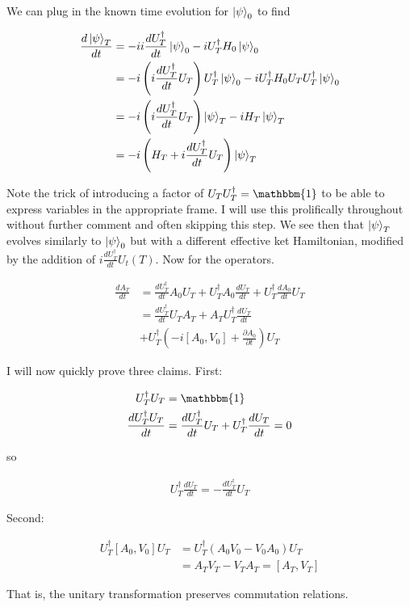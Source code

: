 \documentclass[12pt]{article}
\newcommand{\ddt}[1]{\frac{d #1}{dt}}
\begin{document}
We can plug in the known time evolution for $\ket{\psi}_0$ to find

\begin{align}
\ddt{\ket{\psi}_T} &= -i i\ddt{U_T^{\dag}} \ket{\psi}_0 -i U_T^{\dag} H_0 \ket{\psi}_0\\
&= -i \left(i\ddt{U_T^{\dag}} U_T\right) U_T^{\dag} \ket{\psi}_0 -i U_T^{\dag} H_0U_TU_T^{\dag} \ket{\psi}_0\\
&= -i \left(i\ddt{U_T^{\dag}} U_T\right) \ket{\psi}_T - i H_T \ket{\psi}_T\\
&= -i \left(H_T + i \ddt{U_T^{\dag}} U_T\right)\ket{\psi}_T
\end{align}

Note the trick of introducing a factor of $U_TU_T^{\dag} = \mathbbm{1}$ to be able to express variables in the appropriate frame. I will use this prolifically throughout without further comment and often skipping this step.
We see then that $\ket{\psi}_T$ evolves similarly to $\ket{\psi}_0$ but with a different effective ket Hamiltonian, modified by the addition of $i \ddt{U_T^{\dag}} U_t(T)$. Now for the operators.

\begin{align}
\ddt{A_T} &= \ddt{U_T^{\dag}}A_0U_T + U_T^{\dag}A_0\ddt{U_T} + U_T^{\dag} \ddt{A_0} U_T\\
&= \ddt{U_T^{\dag}} U_TA_T + A_T U_T^{\dag} \ddt{U_T}\\
&+ U_T^{\dag} \left(-i[A_0,V_0] + \frac{\partial A_0}{\partial t}\right)U_T
\end{align}

I will now quickly prove three claims.  First:

\begin{align}
U_T^{\dag} U_T &= \mathbbm{1}\\
\ddt{U_T^{\dag} U_T} &= \ddt{U_T^{\dag}}U_T + U_T^{\dag} \ddt{U_T} = 0
\end{align}

so

\begin{align}
U_T^{\dag} \ddt{U_T} = - \ddt{U_T^{\dag}} U_T
\end{align}

Second:

\begin{align}
U_T^{\dag}[A_0,V_0]U_T &= U_T^{\dag}(A_0V_0 - V_0A_0)U_T\\
&= A_TV_T - V_TA_T = [A_T,V_T]
\end{align}

That is, the unitary transformation preserves commutation relations.
\end{document}
